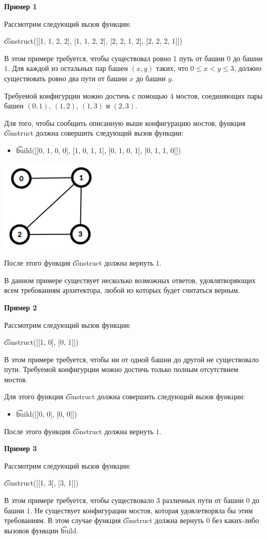 \textbf{Пример 1}

Рассмотрим следующий вызов функции:

\t{construct([[1, 1, 2, 2], [1, 1, 2, 2], [2, 2, 1, 2], [2, 2, 2, 1]])}

В этом примере требуется, чтобы существовал ровно 1 путь от башни $0$ до башни $1$. Для каждой из остальных пар башен $(x, y)$ таких, что $0 \leq x < y \leq 3$, должно существовать ровно два пути от башни $x$ до башни $y$.

Требуемой конфигурции можно достичь с помощью $4$ мостов, соединяющих пары башен $(0, 1)$, $(1, 2)$, $(1, 3)$ и $(2, 3)$.

Для того, чтобы сообщить описанную выше конфигурацию мостов, функция \t{construct} должна совершить следующий вызов функции:
\begin{itemize}
\item \t{build([[0, 1, 0, 0], [1, 0, 1, 1], [0, 1, 0, 1], [0, 1, 1, 0]])}
\end{itemize}

\includegraphics{Supertrees.png}

После этого функция \t{construct} должна вернуть $1$.

В данном примере существует несколько возможных ответов, удовлятворяющих всем требованиям архитектора, любой из которых будет считаться верным.

\textbf{Пример 2}

Рассмотрим следующий вызов функции:

\t{construct([[1, 0], [0, 1]])}

В этом примере требуется, чтобы ни от одной башни до другой не существовало пути. Требуемой конфигурции можно достичь только полным отсутствием мостов.

Для этого функция \t{construct} должна совершить следующий вызов функции:
\begin{itemize}
\item \t{build([[0, 0], [0, 0]])}
\end{itemize}

После этого функция \t{construct} должна вернуть $1$.

\textbf{Пример 3}

Рассмотрим следующий вызов функции:

\t{construct([[1, 3], [3, 1]])}

В этом примере требуется, чтобы существовало $3$ различных пути от башни $0$ до башни $1$. Не существует конфигурации мостов, которая удовлетворяла бы этим требованиям.
В этом случае функция \t{construct} должна вернуть $0$ без каких-либо вызовов функции \t{build}.

